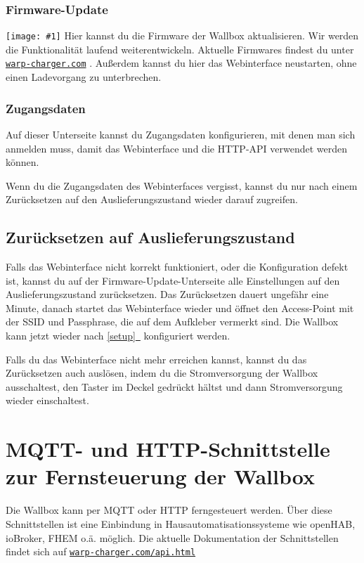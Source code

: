 \documentclass[a4paper,10pt]{article}
\newcommand{\hint}[1]{\begin{tcolorbox}[colback=boxgray,colframe=black,coltext=
white,title=Hinweis,left*=2mm,right*=2mm,boxsep=1mm,bottom=1mm,top=1mm]#1\end{tcolorbox}}
\newcommand{\gfx}[1]{\texttt{[image: \#1]}}
\newcommand*{\fullref}[1]{\hyperref[{#1}]{\ref*{#1}~\nameref*{#1}}}
\newcommand\rurl[2]{%
  \href{#1}{\nolinkurl{#2}}%
}
\begin{document}
\begin{multicols*}{2}
	\subsubsection{Firmware-Update}
	\gfx{./img_warp2/resized/web_firmware_update}
	Hier kannst du die Firmware der Wallbox aktualisieren. Wir werden die Funktionalität
	laufend weiterentwickeln. Aktuelle Firmwares findest du unter \rurl{https://warp-charger.com}{warp-charger.com}.
	Außerdem kannst du hier das Webinterface neustarten, ohne einen Ladevorgang zu unterbrechen.

	\subsubsection{Zugangsdaten}
	Auf dieser Unterseite kannst du Zugangsdaten konfigurieren, mit denen man sich anmelden muss,
	damit das Webinterface und die HTTP-API verwendet werden können.

	\hint{Wenn du die Zugangsdaten des Webinterfaces vergisst, kannst du nur nach einem Zurücksetzen
	auf den Auslieferungszustand wieder darauf zugreifen.}

	\subsection{Zurücksetzen auf Auslieferungszustand}\label{reset}
	Falls das Webinterface nicht korrekt funktioniert, oder die Konfiguration defekt ist,
	kannst du auf der Firmware-Update-Unterseite alle Einstellungen auf den Auslieferungszustand zurücksetzen.
	Das Zurücksetzen dauert ungefähr eine Minute, danach startet das Webinterface wieder und öffnet
	den Access-Point mit der SSID und Passphrase, die auf dem Aufkleber vermerkt sind. Die Wallbox kann jetzt wieder nach \fullref{setup} konfiguriert werden.

	Falls du das Webinterface nicht mehr erreichen kannst, kannst du das Zurücksetzen auch
	auslösen, indem du die Stromversorgung der Wallbox ausschaltest, den Taster im Deckel gedrückt hältst
	und dann Stromversorgung wieder einschaltest.

	\newpage
	\section{MQTT- und HTTP-Schnittstelle zur Fernsteuerung der Wallbox}
	Die Wallbox kann per MQTT oder HTTP ferngesteuert werden. Über diese Schnittstellen ist eine
	Einbindung in Hausautomatisationssysteme wie openHAB, ioBroker, FHEM o.ä. möglich. Die aktuelle
	Dokumentation der Schnittstellen findet sich auf \rurl{https://warp-charger.com/api.html}{warp-charger.com/api.html}


\end{multicols*}
\end{document}
